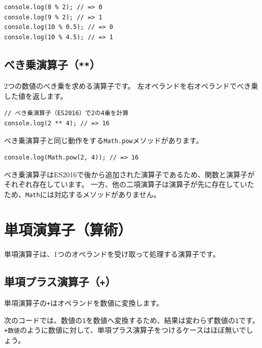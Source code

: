 \begin{lstlisting}
console.log(8 % 2); // => 0
console.log(9 % 2); // => 1
console.log(10 % 0.5); // => 0
console.log(10 % 4.5); // => 1
\end{lstlisting}

\hypertarget{pow-operator}{%
\subsection[べき乗演算子（\texttt{**}）]{べき乗演算子（\texttt{**}）\protect{}}\label{pow-operator}}

2つの数値のべき乗を求める演算子です。
左オペランドを右オペランドでべき乗した値を返します。

\begin{lstlisting}
// べき乗演算子（ES2016）で2の4乗を計算
console.log(2 ** 4); // => 16
\end{lstlisting}

べき乗演算子と同じ動作をする\texttt{Math.pow}メソッドがあります。

\begin{lstlisting}
console.log(Math.pow(2, 4)); // => 16
\end{lstlisting}

べき乗演算子はES2016で後から追加された演算子であるため、関数と演算子がそれぞれ存在しています。
一方、他の二項演算子は演算子が先に存在していたため、\texttt{Math}には対応するメソッドがありません。

\hypertarget{unary-operator}{%
\section{単項演算子（算術）}\label{unary-operator}}

単項演算子は、1つのオペランドを受け取って処理する演算子です。

\hypertarget{unary-plus-operator}{%
\subsection{\texorpdfstring{単項プラス演算子（\texttt{+}）}{単項プラス演算子（+）}}\label{unary-plus-operator}}

単項演算子の\texttt{+}はオペランドを数値に変換します。

次のコードでは、数値の\texttt{1}を数値へ変換するため、結果は変わらず数値の\texttt{1}です。
\texttt{+数値}のように数値に対して、単項プラス演算子をつけるケースはほぼ無いでしょう。

